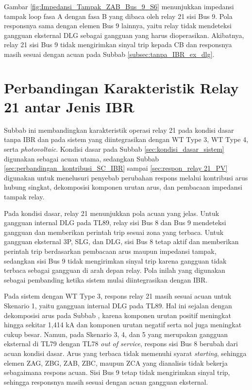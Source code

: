 Gambar \ref{fig:Impedansi_Tampak_ZAB_Bus_9_S6} menunjukkan impedansi tampak loop fasa A dengan fasa B yang dibaca oleh relay 21 sisi Bus 9. Pola responsnya sama dengan elemen Bus 9 lainnya, yaitu relay tidak mendeteksi gangguan eksternal DLG sebagai gangguan yang harus dioperasikan. Akibatnya, relay 21 sisi Bus 9 tidak mengirimkan sinyal trip kepada CB dan responsnya masih sesuai dengan acuan pada Subbab \ref{subsec:tanpa_IBR_ex_dlg}.




\section{Perbandingan Karakteristik Relay 21 antar Jenis IBR}

Subbab ini membandingkan karakteristik operasi relay 21 pada kondisi dasar tanpa IBR dan pada sistem yang diintegrasikan dengan WT Type 3, WT Type 4, serta \textit{photovoltaic}. Kondisi dasar pada Subbab \ref{sec:kondisi_dasar_sistem} digunakan sebagai acuan utama, sedangkan Subbab \ref{sec:perbandingan_kontribusi_SC_IBR} sampai \ref{sec:respon_relay 21_PV} digunakan untuk menelusuri penyebab perubahan respons melalui kontribusi arus hubung singkat, dekomposisi komponen urutan arus, dan pembacaan impedansi tampak relay.

Pada kondisi dasar, relay 21 menunjukkan pola acuan yang jelas. Untuk gangguan internal DLG pada TL89, relay sisi Bus 8 dan Bus 9 mendeteksi gangguan dan memberikan perintah trip sesuai zona yang terbaca. Untuk gangguan eksternal 3P, SLG, dan DLG, sisi Bus 8 tetap aktif dan memberikan perintah trip berdasarkan pembacaan arus maupun impedansi tampak, sedangkan sisi Bus 9 tidak mengirimkan sinyal trip karena gangguan tidak terbaca sebagai gangguan di arah depan relay. Pola inilah yang digunakan sebagai pembanding ketika sistem mulai diintegrasikan dengan IBR.

Pada sistem dengan WT Type 3, respons relay 21 masih sesuai acuan untuk Skenario 1, yaitu gangguan internal DLG pada TL89. Hal ini sejalan dengan dekomposisi arus pada Subbab , karena komponen urutan positif meningkat hingga sekitar 1,414 kA dan komponen urutan negatif serta nol juga meningkat cukup besar. Namun, pada Skenario 3, 4, dan 5 yang merupakan gangguan eksternal di TL79 dengan TL78 \textit{out of service}, respons sisi Bus 8 berubah dari acuan kondisi dasar. Arus yang terbaca tidak memenuhi syarat \textit{starting}, sehingga elemen ZAG, ZBG, ZAB, ZBC, maupun ZCA yang dianalisis tidak bekerja sebagaimana respons acuan. Sisi Bus 9 tetap tidak mengirimkan sinyal trip, sehingga responsnya masih sesuai dengan acuan gangguan eksternal.

